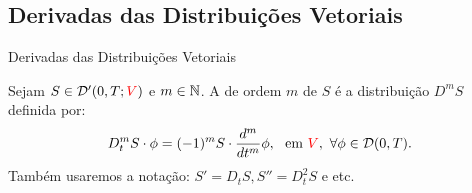 %
%
\subsection*{Derivadas das Distribuições Vetoriais}
\begin{frame}{Derivadas das Distribuições Vetoriais}
\begin{defin}
	Sejam $S\in \mathcal{D}'(0,T;{\color{red}V})$ e $m\in \mathbb{N}$. A  de ordem $m$ de $S$ é a distribuição $D^m S$ definida por:
	\[{D_t^m S\cdot\phi}=(-1)^{m}{S\cdot\frac{d^m}{dt^m}\phi},\ \text{ em } {\color{red}V},\  \forall \phi \in \mathcal{D}(0,T).\]
Também usaremos a notação: \(S'=D_tS, S''=D_t^2S\) e etc.
\end{defin}

\end{frame}

